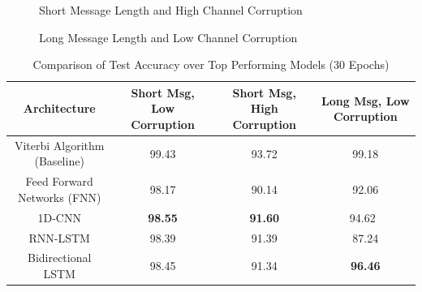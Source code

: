 \documentclass[10pt,twocolumn,letterpaper]{article}
\begin{document}
\begin{figure}[t]
\begin{center}
\end{center}
   \caption{Short Message Length and High Channel Corruption}
\end{figure}


\begin{figure}[t]
\begin{center}
\end{center}
   \caption{Long Message Length and Low Channel Corruption}
\end{figure}

\begin{table}
\begin{center}
\begin{tabular}{|c|c|c|c|}
\hline
Architecture & Short Msg, Low Corruption & 
Short Msg, High Corruption & Long Msg, Low Corruption \\
\hline\hline
Viterbi Algorithm (Baseline) & 99.43 & 93.72 & 99.18  \\
\hline
Feed Forward Networks (FNN) & 98.17 & 90.14 & 92.06  \\
1D-CNN & \textbf{98.55} & \textbf{91.60} & 94.62\  \\
RNN-LSTM & 98.39 & 91.39 & 87.24  \\
Bidirectional LSTM & 98.45 & 91.34 & \textbf{96.46}  \\
\hline
\end{tabular}
\end{center}
\caption{Comparison of Test Accuracy over Top Performing Models (30 Epochs)}
\end{table}
\end{document}
